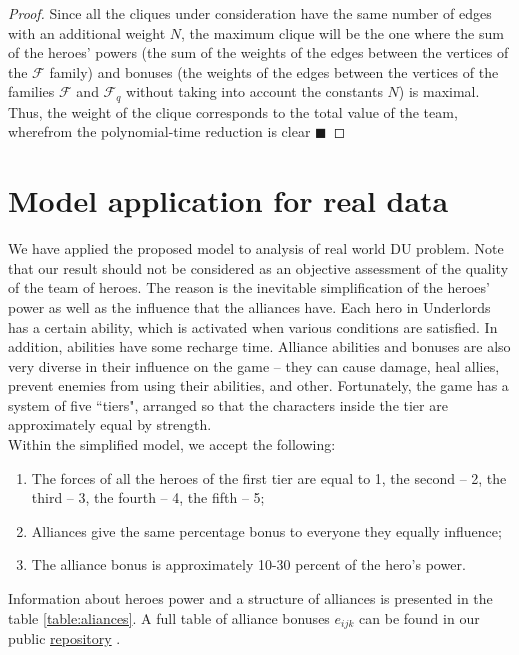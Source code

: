 \documentclass[smallextended]{svjour3}       %
\begin{document}
\begin{proof}
    Since all the cliques under consideration have the same number of edges with an additional weight $N$, the maximum clique will be the one where the sum of the heroes' powers (the sum of the weights of the edges between the vertices of the $ \mathcal{F} $ family) and bonuses (the weights of the edges between the vertices of the families $ \mathcal{F} $ and $ \mathcal {F}_q $ without taking into account the constants $ N $) is maximal.\\
Thus, the weight of the clique corresponds to the total value of the team, wherefrom the polynomial-time reduction is clear $\blacksquare$
\end{proof}
\section{Model application for real data}
\label{SectionComputationalResults}
We have applied the proposed model to analysis of real world DU problem. Note that our result should not be considered as an objective assessment of the quality of the team of heroes. The reason is the inevitable simplification of the heroes’ power as well as the influence that the alliances have. Each hero in Underlords has a certain ability, which is activated when various conditions are satisfied.
In addition, abilities have some recharge time. Alliance abilities and bonuses are also very diverse in their influence on the game -- they can cause damage, heal allies, prevent enemies from using their abilities, and other. Fortunately, the game has a system of five ``tiers", arranged so that the characters inside the tier are approximately equal by strength.\\
Within the simplified model, we accept the following:
\begin{enumerate}
\item The forces of all the heroes of the first tier are equal to 1,  the second -- 2, the third -- 3, the fourth -- 4, the fifth -- 5;
\item Alliances give the same percentage bonus to everyone they equally influence;
\item The alliance bonus is approximately 10-30 percent of the hero’s power.
\end{enumerate}

Information about heroes power and a structure of alliances is presented in the table \ref{table:aliances}.
A full table of alliance bonuses  $e_{ijk} $ can be found in our public \href{https://github.com/aponom84/UnderLords/blob/master/UnderLordsData.xlsx}{repository} \cite{UnderLordsInput}.
\end{document}
